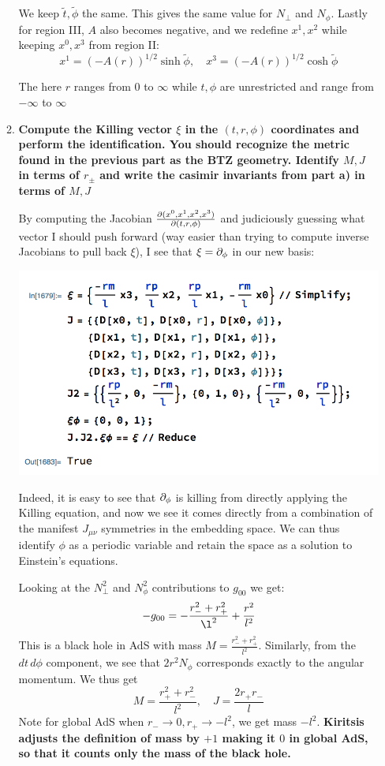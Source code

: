 \documentclass[11pt, class=article, crop=false]{standalone}
\begin{document}
\begin{enumerate}
\begin{enumerate}
		We keep $\tilde t, \tilde \phi$ the same. This gives the same value for $N_{\perp}$ and $N_\phi$. Lastly for region III, $A$ also becomes negative, and we redefine $x^1, x^2$ while keeping $x^0, x^3$ from region II:
		\[
			x^1 = (-A(r))^{1/2} \sinh \tilde \phi, \quad x^3 = (-A(r))^{1/2} \cosh \tilde \phi
		\]
	
		The here $r$ ranges from $0$ to $\infty$ while $t, \phi$ are unrestricted and range from $-\infty$ to $\infty$
	
		\item
		\textbf{Compute the Killing vector $\xi$ in the $(t, r, \phi)$ coordinates and perform the identification. You should recognize the metric found in the previous part as the BTZ geometry. Identify $M,J$ in terms of $r_\pm$ and write the casimir invariants from part a) in terms of $M,J$}
		
		By computing the Jacobian $\frac{\partial(x^{0},x^1,x^2,x^3)}{\partial(t,r,\phi)}$ and judiciously guessing what vector I should push forward (way easier than trying to compute inverse Jacobians to pull back $\xi$), I see that $\xi = \partial_\phi$ in our new basis: 
		\begin{center}
			\includegraphics[scale=0.5]{"Figures/BTZ dphi"}
		\end{center}
		Indeed, it is easy to see that $\partial_\phi$ is killing from directly applying the Killing equation, and now we see it comes directly from a combination of the manifest $J_{\mu \nu}$ symmetries in the embedding space.  We can thus identify $\phi$ as a periodic variable and retain the space as a solution to Einstein's equations.
	
		Looking at the $N_{\perp}^2$ and $N_\phi^2$ contributions to $g_{00}$ we get:
		\[
			-g_{00} = - \frac{r_-^2 + r_+^2}{\l^2}   + \frac{r^2}{l^2} 
		\]
		This is a black hole in AdS with mass $M = \frac{r_-^2 + r_+^2}{l^2}$. Similarly, from the $dt\, d\phi$ component, we see that $2 r^2 N_\phi$ corresponds exactly to the angular momentum. We thus get
		\[
			M = \frac{r_+^2 + r_-^2}{l^2}, \quad J = \frac{2 r_+ r_-}{l}
		\]
		Note for global AdS when $r_-\to 0, r_+ \to -l^2$, we get mass $-l^2$. \textbf{Kiritsis adjusts the definition of mass by $+1$ making it $0$ in global AdS, so that it counts only the mass of the black hole.}
		

\end{enumerate}
\end{enumerate}
\end{document}
